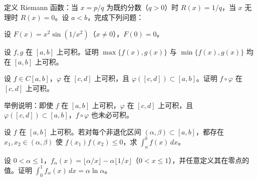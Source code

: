 \noindent\begin{minipage}{\textwidth}
定义 Riemann 函数：当 $x=p/q$ 为既约分数（$q>0$）时 $R(x)=1/q$，当 $x$ 无理时 $R(x)=0$。设 $a<b$，完成下列问题：
\end{minipage}\par\vfill
\noindent\begin{minipage}{\textwidth}
设 $F(x)=x^2\sin(1/x^2)$（$x\ne0$），$F(0)=0$。
\end{minipage}\par\vfill
\newpage
\noindent\begin{minipage}{\textwidth}
设 $f,g$ 在 $[a,b]$ 上可积。证明 $\max\{f(x),g(x)\}$ 与 $\min\{f(x),g(x)\}$ 均在 $[a,b]$ 上可积。
\end{minipage}\par\vfill
\noindent\begin{minipage}{\textwidth}
设 $f\in C[a,b]$，$\varphi$ 在 $[c,d]$ 上可积，且 $\varphi([c,d])\subset[a,b]$。证明 $f\circ\varphi$ 在 $[c,d]$ 上可积。
\end{minipage}\par\vfill
\noindent\begin{minipage}{\textwidth}
举例说明：即使 $f$ 在 $[a,b]$ 上可积，$\varphi$ 在 $[c,d]$ 上可积，且 $\varphi([c,d])\subset[a,b]$，$f\circ\varphi$ 也未必可积。
\end{minipage}\par\vfill
\newpage
\noindent\begin{minipage}{\textwidth}
设 $f$ 在 $[a,b]$ 上可积。若对每个非退化区间 $(\alpha,\beta)\subset[a,b]$，都存在 $x_1,x_2\in(\alpha,\beta)$ 使 $f(x_1)f(x_2)\le0$，求 $\int_a^b f(x)\,dx$。
\end{minipage}\par\vfill
\noindent\begin{minipage}{\textwidth}
设 $0<\alpha\le1$，$f_\alpha(x)=\lfloor\alpha/x\rfloor-\alpha\lfloor1/x\rfloor$（$0<x\le1$），并任意定义其在零点的值。证明 $\int_0^1 f_\alpha(x)\,dx=\alpha\ln\alpha$。
\end{minipage}\par\vfill
